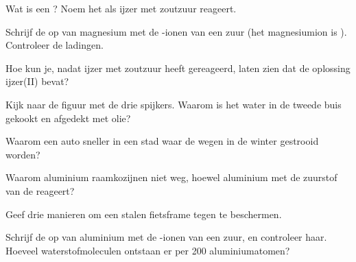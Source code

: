 \begin{exercise}[$\star$]\label{exo:g9:metals-acids-corrosion:4}
Wat is een ? Noem het  als ijzer met zoutzuur
reageert.
\end{exercise}

\begin{exercise}[$\star\star$]\label{exo:g9:metals-acids-corrosion:5}
Schrijf de  op van magnesium met de -ionen van
een zuur (het magnesiumion is ). Controleer de ladingen.
\end{exercise}

\begin{exercise}[$\star\star$]\label{exo:g9:metals-acids-corrosion:6}
Hoe kun je, nadat ijzer met zoutzuur heeft gereageerd, laten zien dat
de oplossing ijzer(II) bevat?
\end{exercise}

\begin{exercise}[$\star\star$]\label{exo:g9:metals-acids-corrosion:7}
Kijk naar de figuur met de drie spijkers. Waarom is het water in de
tweede buis gekookt en afgedekt met olie?
\end{exercise}

\begin{exercise}[$\star\star$]\label{exo:g9:metals-acids-corrosion:8}
Waarom  een auto sneller in een stad waar de wegen in de winter
gestrooid worden?
\end{exercise}

\begin{exercise}[$\star\star$]\label{exo:g9:metals-acids-corrosion:9}
Waarom  aluminium raamkozijnen niet weg, hoewel aluminium met de
zuurstof van de  reageert?
\end{exercise}

\begin{exercise}[$\star\star$]\label{exo:g9:metals-acids-corrosion:10}
Geef drie manieren om een stalen fietsframe tegen  te beschermen.
\end{exercise}

\begin{exercise}[$\star\star\star$]\label{exo:g9:metals-acids-corrosion:11}
Schrijf de  op van aluminium met de -ionen van
een zuur, en controleer haar. Hoeveel waterstofmoleculen ontstaan er
per 200 aluminiumatomen?
\end{exercise}

